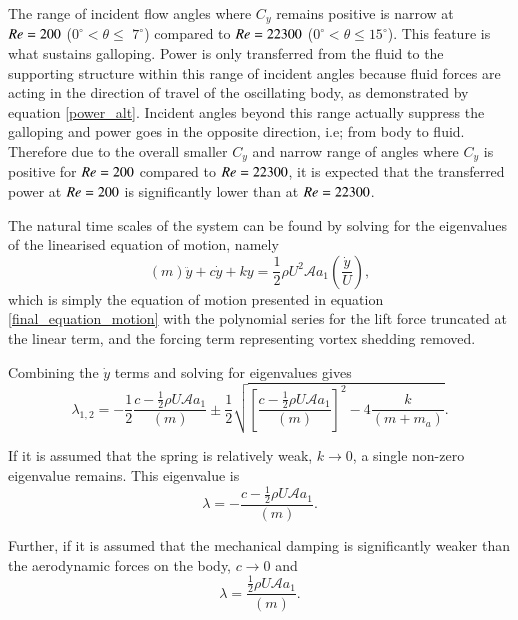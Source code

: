    
  The range of incident flow angles where $C_y$ remains positive is narrow at $Re=200$ ($0^\circ <\theta \leq$ $7^\circ$) compared to $Re=22300$ ($0^\circ <\theta \leq 15^\circ$). This feature is what sustains galloping. Power is only transferred from the fluid to the supporting structure within this range of incident angles because fluid forces are acting in the direction of travel of the oscillating body, as demonstrated by equation \ref{power_alt}. Incident angles beyond this range actually suppress the galloping and power goes in the opposite direction, i.e; from body to fluid. Therefore due to the overall smaller $C_y$ and narrow range of angles where $C_y$ is positive for $Re=200$ compared to $Re=22300$, it is expected that the transferred power at $Re=200$ is significantly lower than at $Re=22300$.
  
 

  The natural time scales of the system can be found by solving for the eigenvalues of the linearised equation of motion, namely
 \begin{equation}
 \label{eqn:eom_linear}
 (m)\ddot{y}{+}c\dot{y}{+}ky{=}\frac{1}{2}\rho U^2 \mathcal{A} a_1\left(\frac{\dot{y}}{U}\right),
 \end{equation}
 which is simply the equation of motion presented in equation \ref{final_equation_motion} with the polynomial series for the lift force truncated at the linear term, and the forcing term representing vortex shedding removed.
 
 Combining the $\dot{y}$ terms and solving for eigenvalues gives
 \begin{equation}
   \label{eqn:eigs}
   \lambda_{1,2}= -\frac{1}{2}\frac{c-\frac{1}{2}\rho U\mathcal{A}a_1}{(m)}\pm\frac{1}{2}\sqrt{\left[\frac{c-\frac{1}{2}\rho U\mathcal{A}a_1}{(m)}\right]^2-4\frac{k}{(m+m_a)}}.
 \end{equation}
 
 If it is assumed that the spring is relatively weak, $k\rightarrow 0$, a single non-zero eigenvalue remains. This eigenvalue is
 \begin{equation}
   \label{eqn:eigs_nospring}
   \lambda=-\frac{c-\frac{1}{2}\rho U\mathcal{A}a_1}{(m)}.
 \end{equation}
 
 Further, if it is assumed that the mechanical damping is significantly weaker than the aerodynamic forces on the body, $c\rightarrow 0$ and
 \begin{equation}
   \label{eqn:eigs_nospring_nodamp}
   \lambda=\frac{\frac{1}{2}\rho U\mathcal{A}a_1}{(m)}.
 \end{equation}
 

